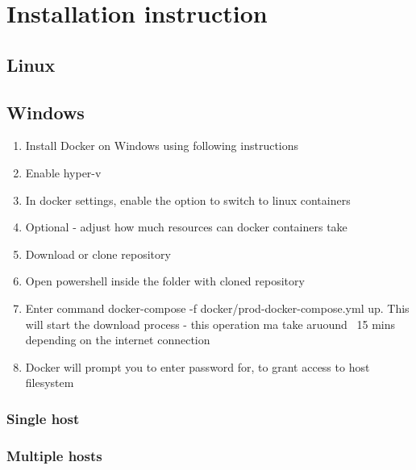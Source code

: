 \chapter{Installation instruction}
\section{Linux}
\section{Windows}
\begin{enumerate}
    \item Install Docker on Windows using following instructions
    \item Enable hyper-v
    \item In docker settings, enable the option to switch to linux containers
    \item Optional - adjust how much resources can docker containers take
    \item Download or clone repository
    \item Open powershell inside the folder with cloned repository
    \item Enter command docker-compose -f docker/prod-docker-compose.yml up. This will start the download process - this operation ma take aruound ~15 mins depending on the internet connection
    \item Docker will prompt you to enter password for, to grant access to host filesystem
\end{enumerate}
\subsection{Single host}
\subsection{Multiple hosts}